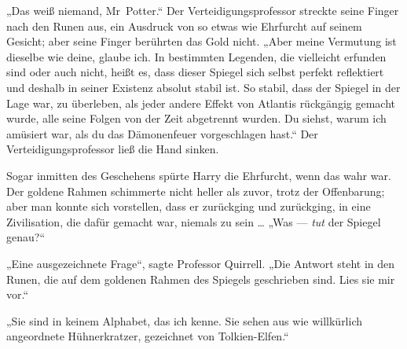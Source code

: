 „Das weiß niemand, Mr~Potter.“ Der Verteidigungsprofessor streckte seine Finger nach den Runen aus, ein Ausdruck von so etwas wie Ehrfurcht auf seinem Gesicht; aber seine Finger berührten das Gold nicht.
„Aber meine Vermutung ist dieselbe wie deine, glaube ich. In bestimmten Legenden, die vielleicht erfunden sind oder auch nicht, heißt es, dass dieser Spiegel sich selbst perfekt reflektiert und deshalb in seiner Existenz absolut stabil ist. So stabil, dass der Spiegel in der Lage war, zu überleben, als jeder andere Effekt von Atlantis rückgängig gemacht wurde, alle seine Folgen von der Zeit abgetrennt wurden. Du siehst, warum ich amüsiert war, als du das Dämonenfeuer vorgeschlagen hast.“
Der Verteidigungsprofessor ließ die Hand sinken.

Sogar inmitten des Geschehens spürte Harry die Ehrfurcht, wenn das wahr war. Der goldene Rahmen schimmerte nicht heller als zuvor, trotz der Offenbarung; aber man konnte sich vorstellen, dass er zurückging und zurückging, in eine Zivilisation, die dafür gemacht war, niemals zu sein …
„Was — \emph{tut} der Spiegel genau?“

„Eine ausgezeichnete Frage“, sagte Professor Quirrell.
„Die Antwort steht in den Runen, die auf dem goldenen Rahmen des Spiegels geschrieben sind. Lies sie mir vor.“

„Sie sind in keinem Alphabet, das ich kenne. Sie sehen aus wie willkürlich angeordnete Hühnerkratzer, gezeichnet von Tolkien-Elfen.“

